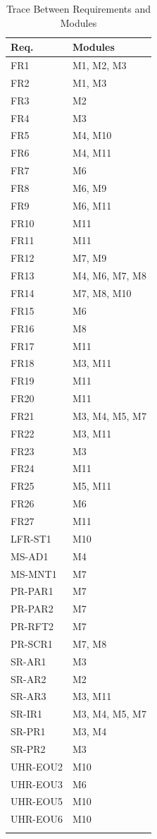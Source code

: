 \documentclass[12pt, titlepage]{article}
\begin{document}
\begin{longtable}{p{} p{}}
\toprule
\textbf{Req.} & \textbf{Modules}\\
\midrule
FR1 & M1, M2, M3\\
FR2 & M1, M3\\
FR3 & M2\\
FR4 & M3\\
FR5 & M4, M10\\
FR6 & M4, M11\\
FR7 & M6\\
FR8 & M6, M9\\
FR9 & M6, M11\\
FR10 & M11\\
FR11 & M11\\
FR12 & M7, M9\\
FR13 & M4, M6, M7, M8\\
FR14 & M7, M8, M10\\
FR15 & M6\\
FR16 & M8\\
FR17 & M11\\
FR18 & M3, M11\\
FR19 & M11\\
FR20 & M11\\
FR21 & M3, M4, M5, M7\\
FR22 & M3, M11\\
FR23 & M3\\
FR24 & M11\\
FR25 & M5, M11\\
FR26 & M6\\
FR27 & M11\\
LFR-ST1 & M10\\
MS-AD1 & M4\\
MS-MNT1 & M7\\
PR-PAR1 & M7\\
PR-PAR2 & M7\\
PR-RFT2 & M7\\
PR-SCR1 & M7, M8\\
SR-AR1 & M3\\
SR-AR2 & M2\\
SR-AR3 & M3, M11\\
SR-IR1 & M3, M4, M5, M7\\
SR-PR1 & M3, M4\\
SR-PR2 & M3\\
UHR-EOU2 & M10\\
UHR-EOU3 & M6\\
UHR-EOU5 & M10\\
UHR-EOU6 & M10\\
\bottomrule
\caption{Trace Between Requirements and Modules}
\label{TblRT}
\end{longtable}
\end{document}
